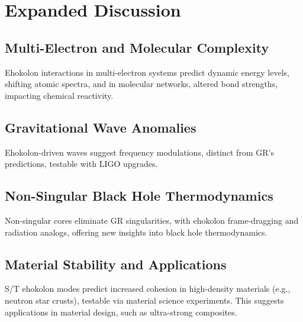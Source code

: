 \documentclass{article}
\begin{document}
\section{Expanded Discussion}
\subsection{Multi-Electron and Molecular Complexity}
Ehokolon interactions in multi-electron systems predict dynamic energy levels, shifting atomic spectra, and in molecular networks, altered bond strengths, impacting chemical reactivity.

\subsection{Gravitational Wave Anomalies}
Ehokolon-driven waves suggest frequency modulations, distinct from GR’s predictions, testable with LIGO upgrades.

\subsection{Non-Singular Black Hole Thermodynamics}
Non-singular cores eliminate GR singularities, with ehokolon frame-dragging and radiation analogs, offering new insights into black hole thermodynamics.

\subsection{Material Stability and Applications}
S/T ehokolon modes predict increased cohesion in high-density materials (e.g., neutron star crusts), testable via material science experiments. This suggests applications in material design, such as ultra-strong composites.
\end{document}

